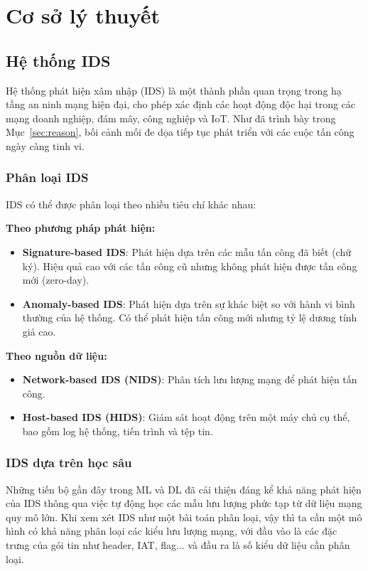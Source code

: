 
\chapter{Cơ sở lý thuyết}
\section{Hệ thống IDS}
\label{sec:ids}

Hệ thống phát hiện xâm nhập (IDS) là một thành phần quan trọng trong hạ tầng an ninh mạng hiện đại, cho phép xác định các hoạt động độc hại trong các mạng doanh nghiệp, đám mây, công nghiệp và IoT. Như đã trình bày trong Mục~\ref{sec:reason}, bối cảnh mối đe dọa tiếp tục phát triển với các cuộc tấn công ngày càng tinh vi.

\subsection{Phân loại IDS}
IDS có thể được phân loại theo nhiều tiêu chí khác nhau:

\textbf{Theo phương pháp phát hiện:}
\begin{itemize}
    \item \textbf{Signature-based IDS}: Phát hiện dựa trên các mẫu tấn công đã biết (chữ ký). Hiệu quả cao với các tấn công cũ nhưng không phát hiện được tấn công mới (zero-day).
    \item \textbf{Anomaly-based IDS}: Phát hiện dựa trên sự khác biệt so với hành vi bình thường của hệ thống. Có thể phát hiện tấn công mới nhưng tỷ lệ dương tính giả cao.
\end{itemize}

\textbf{Theo nguồn dữ liệu:}
\begin{itemize}
    \item \textbf{Network-based IDS (NIDS)}: Phân tích lưu lượng mạng để phát hiện tấn công.
    \item \textbf{Host-based IDS (HIDS)}: Giám sát hoạt động trên một máy chủ cụ thể, bao gồm log hệ thống, tiến trình và tệp tin.
\end{itemize}

\subsection{IDS dựa trên học sâu}
Những tiến bộ gần đây trong ML và DL đã cải thiện đáng kể khả năng phát hiện của IDS thông qua việc tự động học các mẫu lưu lượng phức tạp từ dữ liệu mạng quy mô lớn. Khi xem xét IDS như một bài toán phân loại, vậy thì ta cần một mô hình có khả năng phân loại các kiểu lưu lượng mạng, với đầu vào là các đặc trưng của gói tin như header, IAT, flag... và đầu ra là số kiểu dữ liệu cần phân loại.

